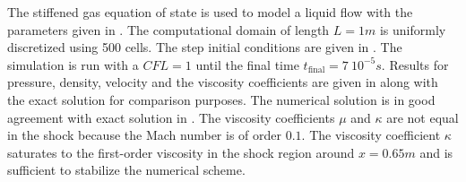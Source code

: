 The stiffened gas equation of state is used to model a liquid flow with the parameters given in . The computational domain of length $L=1m$ is uniformly discretized using 500 cells. The step initial conditions are given in .
%
The simulation is run with a $CFL=1$ until the final time $t_{\text{final}} = 7 \ 10^{-5}s$. Results for pressure, density, velocity and the viscosity coefficients are given in  along with the exact solution for comparison purposes. The numerical solution is in good agreement with exact solution in . The viscosity coefficients $\mu$ and $\kappa$ are not equal in the shock because the Mach number is of order $0.1$. The viscosity coefficient $\kappa$ saturates to the first-order viscosity in the shock region around $x = 0.65m$ and is sufficient to stabilize the numerical scheme. 
%
